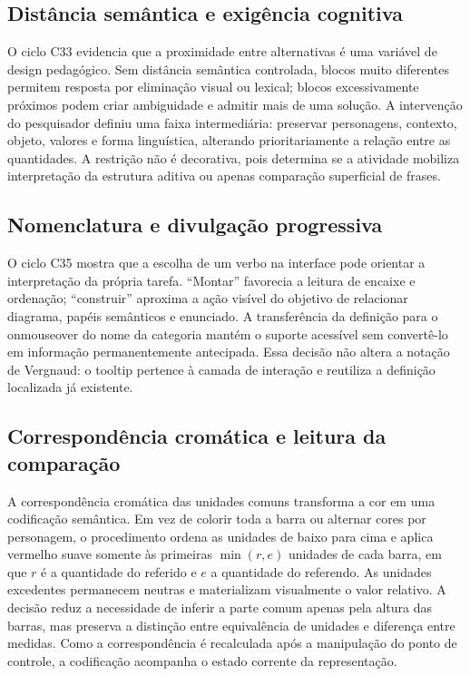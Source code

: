 \documentclass[preprint,12pt,authoryear]{elsarticle}
\begin{document}
\subsection{Distância semântica e exigência cognitiva}
O ciclo C33 evidencia que a proximidade entre alternativas é uma variável de design pedagógico. Sem distância semântica controlada, blocos muito diferentes permitem resposta por eliminação visual ou lexical; blocos excessivamente próximos podem criar ambiguidade e admitir mais de uma solução. A intervenção do pesquisador definiu uma faixa intermediária: preservar personagens, contexto, objeto, valores e forma linguística, alterando prioritariamente a relação entre as quantidades. A restrição não é decorativa, pois determina se a atividade mobiliza interpretação da estrutura aditiva ou apenas comparação superficial de frases.

\subsection{Nomenclatura e divulgação progressiva}
O ciclo C35 mostra que a escolha de um verbo na interface pode orientar a interpretação da própria tarefa. ``Montar'' favorecia a leitura de encaixe e ordenação; ``construir'' aproxima a ação visível do objetivo de relacionar diagrama, papéis semânticos e enunciado. A transferência da definição para o onmouseover do nome da categoria mantém o suporte acessível sem convertê-lo em informação permanentemente antecipada. Essa decisão não altera a notação de Vergnaud: o tooltip pertence à camada de interação e reutiliza a definição localizada já existente.

\subsection{Correspondência cromática e leitura da comparação}
A correspondência cromática das unidades comuns transforma a cor em uma codificação semântica. Em vez de colorir toda a barra ou alternar cores por personagem, o procedimento ordena as unidades de baixo para cima e aplica vermelho suave somente às primeiras $\min(r,e)$ unidades de cada barra, em que $r$ é a quantidade do referido e $e$ a quantidade do referendo. As unidades excedentes permanecem neutras e materializam visualmente o valor relativo. A decisão reduz a necessidade de inferir a parte comum apenas pela altura das barras, mas preserva a distinção entre equivalência de unidades e diferença entre medidas. Como a correspondência é recalculada após a manipulação do ponto de controle, a codificação acompanha o estado corrente da representação.
\end{document}
